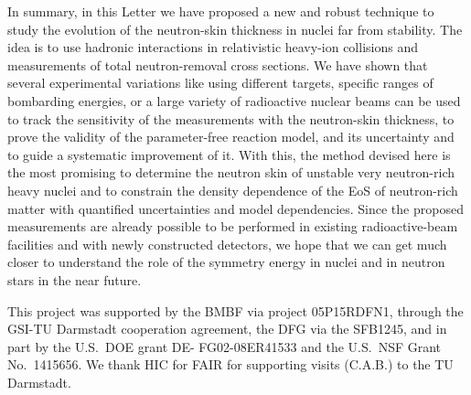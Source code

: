 \documentclass[english,aps,prl,twocolumn,superscriptaddress]{revtex4}
\begin{document}
In summary, in this Letter we have proposed a new and robust technique to study the evolution of the neutron-skin thickness in nuclei far from stability. The idea is to use hadronic interactions in relativistic heavy-ion collisions and measurements of total neutron-removal cross sections. We have shown that several experimental variations like using different targets, specific ranges of bombarding energies, or a large variety of radioactive nuclear beams can be used to track the sensitivity of the measurements with the neutron-skin thickness, to prove the validity of the parameter-free reaction model, and its uncertainty and to guide a systematic improvement of it. With this, the method devised here is the most promising to determine the neutron skin of unstable very neutron-rich heavy nuclei and to constrain the density dependence of the EoS of neutron-rich matter with quantified uncertainties and model dependencies. Since the proposed measurements are already possible to be performed in existing radioactive-beam facilities and with newly constructed detectors, we hope that we can get much closer to understand the role of the symmetry energy in nuclei and in neutron stars in the near future.  

This project was supported by the BMBF via project 05P15RDFN1, through the GSI-TU Darmstadt cooperation agreement, the DFG via the SFB1245, and in part by the U.S.\ DOE grant DE- FG02-08ER41533 and the U.S.\ NSF Grant No.\ 1415656. We thank HIC for FAIR for supporting visits (C.A.B.) to the TU Darmstadt.
\end{document}
